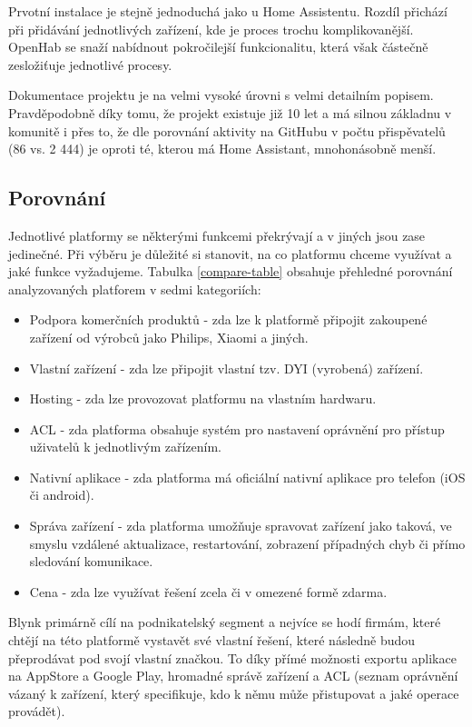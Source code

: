 Prvotní instalace je stejně jednoduchá jako u Home Assistentu. Rozdíl přichází při přidávání jednotlivých zařízení, kde je proces trochu komplikovanější. OpenHab se snaží nabídnout pokročilejší funkcionalitu, která však částečně zesložiťuje jednotlivé procesy. \cite{openhab-doc}

Dokumentace projektu je na velmi vysoké úrovni s velmi detailním popisem. Pravděpodobně díky tomu, že projekt existuje již 10 let a má silnou základnu v komunitě i přes to, že dle porovnání aktivity na GitHubu v počtu přispěvatelů (86 vs. 2 444) je oproti té, kterou má Home Assistant, mnohonásobně menší.

\subsection{Porovnání}
Jednotlivé platformy se některými funkcemi překrývají a v jiných jsou zase jedinečné. Při výběru je důležité si stanovit, na co platformu chceme využívat a jaké funkce vyžadujeme. Tabulka \ref{compare-table} obsahuje přehledné porovnání analyzovaných platforem v sedmi kategoriích:
\begin{itemize}
    \item Podpora komerčních produktů - zda lze k platformě připojit zakoupené zařízení od výrobců jako Philips, Xiaomi a jiných.
    \item Vlastní zařízení - zda lze připojit vlastní tzv. DYI (vyrobená) zařízení.
    \item Hosting - zda lze provozovat platformu na vlastním hardwaru.
    \item ACL - zda platforma obsahuje systém pro nastavení oprávnění pro přístup uživatelů k jednotlivým zařízením.
    \item Nativní aplikace - zda platforma má oficiální nativní aplikace pro telefon (iOS či android).
    \item Správa zařízení - zda platforma umožňuje spravovat zařízení jako taková, ve smyslu vzdálené aktualizace, restartování, zobrazení případných chyb či přímo sledování komunikace.
    \item Cena - zda lze využívat řešení zcela či v omezené formě zdarma.
\end{itemize}

Blynk primárně cílí na podnikatelský segment a nejvíce se hodí firmám, které chtějí na této platformě vystavět své vlastní řešení, které následně budou přeprodávat pod svojí vlastní značkou. To díky přímé možnosti exportu aplikace na AppStore a Google Play, hromadné správě zařízení a ACL (seznam oprávnění vázaný k zařízení, který specifikuje, kdo k němu může přistupovat a jaké operace provádět).

